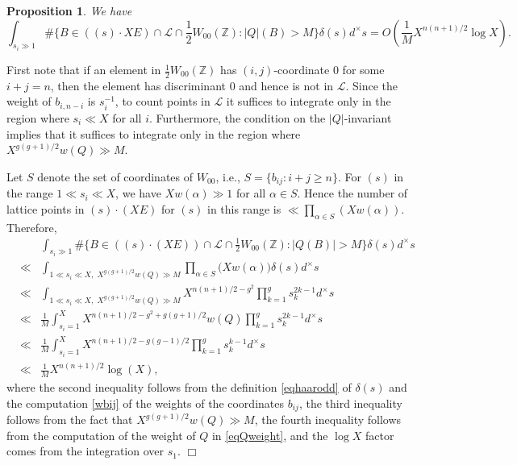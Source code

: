 \documentclass[11pt]{article}
\def\Z{{\mathbb Z}}
\def\Z{{\mathbb Z}}
\def\LL{{\mathcal L}}
\newtheorem{proposition}[theorem]{Proposition}
\newenvironment{proof}{\noindent {\bf Proof:}}{$\Box$ \vspace{2 ex}}
\begin{document}
\begin{proposition}\label{proplargeQbound}
We have
\begin{equation*}
\int_{s_i\gg 1} \#\{B\in ((s)\cdot XE)\cap \LL\cap
{\textstyle\frac12} W_{00}(\Z):|Q|(B)>M\}\delta(s)d^\times s=O(\frac{1}{M}X^{n(n+1)/2}\log X).
\end{equation*}
\end{proposition}

\begin{proof}
First note that if an element in $\frac12 W_{00}(\Z)$ has
$(i,j)$-coordinate $0$ for some $i+j=n$, then the element has
discriminant $0$ and hence is not in $\LL$. Since the weight of $b_{i,n-i}$ is $s_i^{-1}$, to count points in $\LL$ it suffices to integrate only in the region where $s_i\ll X$ for all $i$.
Furthermore, the condition on the $|Q|$-invariant implies that
it suffices to integrate only in the region where $X^{g(g+1)/2}w(Q) \gg M$.



Let $S$ denote the set of coordinates of $W_{00}$, i.e.,
$S=\{b_{ij}:i+j\geq n\}$. For $(s)$ in the range $1\ll s_i\ll X$, we
have $Xw(\alpha)\gg 1$ for all $\alpha\in S$. Hence the number of lattice points in $(s)\cdot (XE)$ for $(s)$ in this range is $\ll \prod_{\alpha\in S}(Xw(\alpha))$. Therefore, 
\begin{eqnarray*}
&&\displaystyle\int_{s_i\gg 1} \#\{B\in((s)\cdot (XE))\cap \LL\cap {\textstyle\frac12} W_{00}(\Z):|Q(B)|>M\}\delta(s)d^\times s \\
&\ll&\displaystyle\int_{1\ll s_i\ll X,\,\,X^{g(g+1)/2}w(Q) \gg M} \prod_{\alpha\in S}\bigl(Xw(\alpha)\bigr)\delta(s)d^\times s \\
&\ll&\displaystyle\int_{1\ll s_i\ll X,\,\,X^{g(g+1)/2}w(Q) \gg M} X^{n(n+1)/2-g^2}\prod_{k=1}^gs_k^{2k-1}d^\times s \\
&\ll&\displaystyle\frac{1}{M}\int_{s_i=1}^X X^{n(n+1)/2-g^2+g(g+1)/2}w(Q)\prod_{k=1}^gs_k^{2k-1}d^\times s \\
&\ll&\displaystyle\frac{1}{M}\int_{s_i=1}^X X^{n(n+1)/2-g(g-1)/2}\prod_{k=1}^gs_k^{k-1}d^\times s \\
&\ll&\displaystyle\frac{1}{M}X^{n(n+1)/2}\log(X),
\end{eqnarray*}
where the second inequality follows from the definition
\eqref{eqhaarodd} of $\delta(s)$ and the computation \eqref{wbij} of
the weights of the coordinates $b_{ij}$, the third inequality follows
from the fact that $X^{g(g+1)/2}w(Q) \gg M$, the fourth inequality
follows from the computation of the weight of $Q$ in
\eqref{eqQweight}, and the $\log X$ factor comes from the integration
over $s_1$.
\end{proof}
\end{document}
